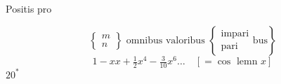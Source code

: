 \begin{center}Positis pro\end{center}
\[\left\{\begin{array}{c}m\\n\end{array}\right\}\text{ omnibus valoribus }
\left\{\begin{array}{l}\text{impari}\\\text{pari}\end{array}\text{bus}\right\}\]
\[1-xx+\tfrac12x^4-\tfrac3{10}x^6\ldots\quad[=\cos\text{ lemn }x]\]
\vfill\hfill\(20^*\)\par
\clearpage
\endgroup
